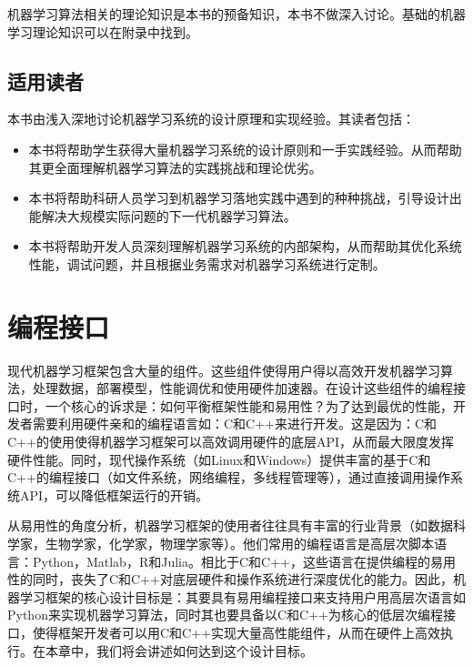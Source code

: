 \documentclass[letterpaper,10pt,english]{sphinxmanual}
\begin{document}
\sphinxAtStartPar
机器学习算法相关的理论知识是本书的预备知识，本书不做深入讨论。基础的机器学习理论知识可以在附录中找到。


\section{适用读者}
\label{\detokenize{chapter_introduction/applicable_readers:id1}}\label{\detokenize{chapter_introduction/applicable_readers::doc}}
\sphinxAtStartPar
本书由浅入深地讨论机器学习系统的设计原理和实现经验。其读者包括：
\begin{itemize}
\item {} 
\sphinxAtStartPar
{}
本书将帮助学生获得大量机器学习系统的设计原则和一手实践经验。从而帮助其更全面理解机器学习算法的实践挑战和理论优劣。

\item {} 
\sphinxAtStartPar
{}
本书将帮助科研人员学习到机器学习落地实践中遇到的种种挑战，引导设计出能解决大规模实际问题的下一代机器学习算法。

\item {} 
\sphinxAtStartPar
{}
本书将帮助开发人员深刻理解机器学习系统的内部架构，从而帮助其优化系统性能，调试问题，并且根据业务需求对机器学习系统进行定制。

\end{itemize}


\chapter{编程接口}
\label{\detokenize{chapter_programming_interface/index:id1}}\label{\detokenize{chapter_programming_interface/index::doc}}
\sphinxAtStartPar
现代机器学习框架包含大量的组件。这些组件使得用户得以高效开发机器学习算法，处理数据，部署模型，性能调优和使用硬件加速器。在设计这些组件的编程接口时，一个核心的诉求是：如何平衡框架性能和易用性？为了达到最优的性能，开发者需要利用硬件亲和的编程语言如：C和C++来进行开发。这是因为：C和C++的使用使得机器学习框架可以高效调用硬件的底层API，从而最大限度发挥硬件性能。同时，现代操作系统（如Linux和Windows）提供丰富的基于C和C++的编程接口（如文件系统，网络编程，多线程管理等），通过直接调用操作系统API，可以降低框架运行的开销。

\sphinxAtStartPar
从易用性的角度分析，机器学习框架的使用者往往具有丰富的行业背景（如数据科学家，生物学家，化学家，物理学家等）。他们常用的编程语言是高层次脚本语言：Python，Matlab，R和Julia。相比于C和C++，这些语言在提供编程的易用性的同时，丧失了C和C++对底层硬件和操作系统进行深度优化的能力。因此，机器学习框架的核心设计目标是：其要具有易用编程接口来支持用户用高层次语言如Python来实现机器学习算法，同时其也要具备以C和C++为核心的低层次编程接口，使得框架开发者可以用C和C++实现大量高性能组件，从而在硬件上高效执行。在本章中，我们将会讲述如何达到这个设计目标。
\end{document}
